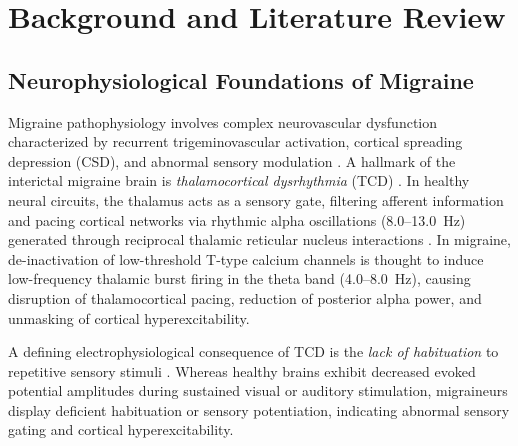 \documentclass[12pt, a4paper]{report}
\begin{document}
\chapter{Background and Literature Review}
\label{ch:background}

\section{Neurophysiological Foundations of Migraine}
\label{sec:neuro_foundations}
Migraine pathophysiology involves complex neurovascular dysfunction characterized by recurrent trigeminovascular activation, cortical spreading depression (CSD), and abnormal sensory modulation \cite{Zhang2023,VanDenHoek2024}. A hallmark of the interictal migraine brain is \textit{thalamocortical dysrhythmia} (TCD) \cite{VanDenHoek2024,AbdulhusseinAldeen2024}. In healthy neural circuits, the thalamus acts as a sensory gate, filtering afferent information and pacing cortical networks via rhythmic alpha oscillations (8.0--13.0~Hz) generated through reciprocal thalamic reticular nucleus interactions \cite{Zhang2023}. In migraine, de-inactivation of low-threshold T-type calcium channels is thought to induce low-frequency thalamic burst firing in the theta band (4.0--8.0~Hz), causing disruption of thalamocortical pacing, reduction of posterior alpha power, and unmasking of cortical hyperexcitability.

A defining electrophysiological consequence of TCD is the \textit{lack of habituation} to repetitive sensory stimuli \cite{chamanzar2021uhd,AbdulhusseinAldeen2024}. Whereas healthy brains exhibit decreased evoked potential amplitudes during sustained visual or auditory stimulation, migraineurs display deficient habituation or sensory potentiation, indicating abnormal sensory gating and cortical hyperexcitability.
\end{document}
